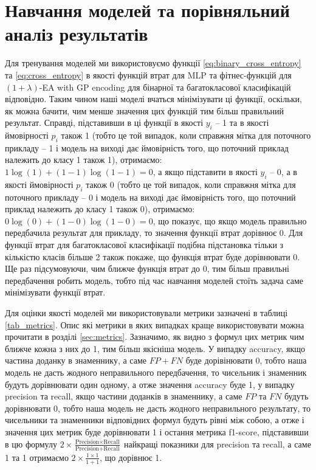 \section{Навчання моделей та порівняльний аналіз результатів}

Для тренування моделей ми використовуємо функції \ref{eq:binary_cross_entropy} та \ref{eq:cross_entropy} в якості функцій втрат для MLP та фітнес-функцій для $(1+\lambda)$-EA with GP encoding для бінарної та багатокласової класифікацій відповідно. Таким чином наші моделі вчаться мінімізувати ці функції, оскільки, як можна бачити, чим менше значення цих функцій тим більш правильний результат. Справді, підставивши в ці функції в якості $y_i$ -- 1 та в якості ймовірності $p_i$ також 1 (тобто це той випадок, коли справжня мітка для поточного прикладу -- 1 і модель на виході дає ймовірність того, що поточний приклад належить до класу 1 також 1), отримаємо: $1 \log(1) + (1 - 1) \log(1 - 1) = 0$, а якщо підставити в якості $y_i$ -- 0, а в якості ймовірності $p_i$ також 0 (тобто це той випадок, коли справжня мітка для поточного прикладу -- 0 і модель на виході дає ймовірність того, що поточний приклад належить до класу 1 також 0), отримаємо: $0 \log(0) + (1 - 0) \log(1 - 0) = 0$, що показує, що якщо модель правильно передбачила результат для прикладу, то значення функції втрат дорівнює 0. Для функції втрат для багатокласової класифікації подібна підстановка тільки з кількістю класів більше 2 також покаже, що функція втрат буде дорівнювати 0. Ще раз підсумовуючи, чим ближче функція втрат до 0, тим більш правильні передбачення робить модель, тобто під час навчання моделей стоїть задача саме мінімізувати функції втрат.

Для оцінки якості моделей ми використовували метрики зазначені в таблиці \ref{tab_metrics}. Опис які метрики в яких випадках краще використовувати можна прочитати в розділі \ref{sec:metrics}. Зазначимо, як видно з формул цих метрик чим ближче кожна з них до 1, тим більш якісніша модель. У випадку accuracy, якщо частина доданку в знаменнику, а саме $FP+FN$ буде дорівінювати 0, тобто наша модель не дасть жодного неправильного передбачення, то чисельник і знаменник будуть дорівнювати один одному, а отже значення accuracy буде 1, у випадку precision та recall, якщо частини доданків в знаменнику, а саме $FP$ та $FN$ будуть дорівнювати 0, тобто наша модель не дасть жодного неправильного результату, то чисельники та знаменники відповідних формул будуть рівні між собою, а отже і значення цих метрик буде дорівнювати 1 і остання метрика f1-score, підставивши в цю формулу $2 \times \frac{\text{Precision} \times \text{Recall}}{\text{Precision} + \text{Recall}}$ найкращі показники для precision та recall, а саме 1 та 1 отримаємо $2 \times \frac{1 \times 1}{1 + 1}$, що дорівнює 1.

